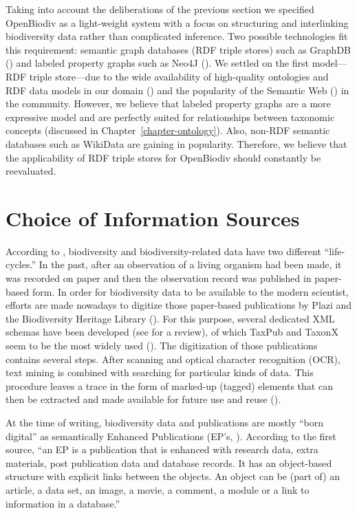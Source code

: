 Taking into account the deliberations of the previous section we specified OpenBiodiv as a light-weight system with a focus on structuring and interlinking biodiversity data rather than complicated inference. Two possible technologies fit this requirement: semantic graph databases (RDF triple stores) such as GraphDB (\cite{ontotext_graphdb_2018}) and labeled property graphs such as Neo4J (\cite{neo4j_developers_neo4j_2012}). We settled on the first model---RDF triple store---due to the wide availability of high-quality ontologies and RDF data models in our domain (\cite{baskauf_darwin-sw:_2016,peroni_semantic_2014}) and the popularity of the Semantic Web (\cite{berners-lee_semantic_2001}) in the community. However, we believe that labeled property graphs are a more expressive model and are perfectly suited for relationships between taxonomic concepts (discussed in Chapter~\ref{chapter-ontology}). Also, non-RDF semantic databases such as \mbox{WikiData} are gaining in popularity. Therefore, we believe that the applicability of RDF triple stores for OpenBiodiv should constantly be reevaluated.

\section{Choice of Information Sources}

According to \cite{soraya_sierra_coordination_2014}, biodiversity and biodiversity-related data have two different ``life-cycles.'' In the past, after an observation of a living organism had been made, it was recorded on paper and then the observation record was published in paper-based form. In order for biodiversity data to be available to the modern scientist, efforts are made nowadays to digitize those paper-based publications by Plazi and the Biodiversity Heritage Library (\cite{agosti_why_2007,miller_taxonomic_2012}). For this purpose, several dedicated XML schemas have been developed (see \cite{penev_xml_2011} for a review), of which TaxPub and TaxonX  seem to be the most widely used (\cite{catapano_taxpub:_2010,penev_implementation_2012}). The digitization of those publications contains several steps. After scanning and optical character recognition (OCR), text mining is combined with searching for particular kinds of data. This procedure leaves a trace in the form of marked-up (tagged) elements that can then be extracted and made available for future use and reuse (\cite{miller_integrating_2015}).

At the time of writing, biodiversity data and publications are mostly ``born digital'' as semantically Enhanced Publications (EP's, \cite{claerbout_electronic_1992,godtsenhoven_van_emerging_2009,shotton_semantic_2009}). According to the first source, ``an EP is a publication that is enhanced with research data, extra materials, post publication data and database records. It has an object-based structure with explicit links between the objects. An object can be (part of) an article, a data set, an image, a movie, a comment, a module or a link to information in a database.''

